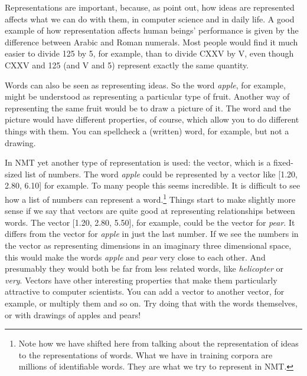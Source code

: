 \documentclass[output=paper]{langscibook}
\begin{document}
Representations are important, because, as \citet{deeplearningbook} point out, how ideas are represented affects what we can do with them, in computer science and in daily life. A good example of how representation affects human beings' performance is given by the difference between Arabic and Roman numerals. Most people would find it much easier to divide 125 by 5, for example, than to divide CXXV by V, even though CXXV and 125 (and V and 5) represent exactly the same quantity.

Words can also be seen as representing ideas. So the word  \textit{apple}, for example, might be understood as representing a particular type of fruit. Another way of representing the same fruit would be to draw a picture of it. The word and the picture would have different properties, of course, which allow you to do different things with them. You can spellcheck a (written) word, for example, but not a drawing. 

In NMT yet another type of representation is used: the vector, which is a fixed-sized list of numbers. The word \textit{apple} could be represented by a vector like [1.20, 2.80, 6.10] for example. To many people this seems incredible. It is difficult to see how a list of numbers can represent a word.\footnote{Note how we have shifted here from talking about the representation of ideas to the representations of words. What we have in training corpora are millions of identifiable words. They are what we try to represent in NMT.} Things start to make slightly more sense if we say that vectors are quite good at representing relationships between words. The vector [1.20, 2.80, 5.50], for example, could be the vector for \textit{pear}. It differs from the vector for \textit{apple} in just the last number. If we see the numbers in the vector as representing dimensions in an imaginary three dimensional space, this would make the words \textit{apple} and \textit{pear} very close to each other. And presumably they would both be far from less related words, like \textit{helicopter} or \textit{very}. Vectors have other interesting properties that make them particularly attractive to computer scientists. You can add a vector to another vector, for example, or multiply them and so on. Try doing that with the words themselves, or with drawings of apples and pears!
\end{document}
